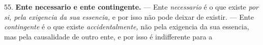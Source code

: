  55. \textbf{Ente necessario e ente contingente.} --- Ente \emph{necessario} é o que existe \emph{por si, pela exigencia da sua essencia,} e por isso não pode deixar de existir. --- Ente \emph{contingente} é o que existe \emph{accidentalmente,} não pela exigencia da sua essencia, mas pela causalidade de outro ente, e por isso é indifferente para a